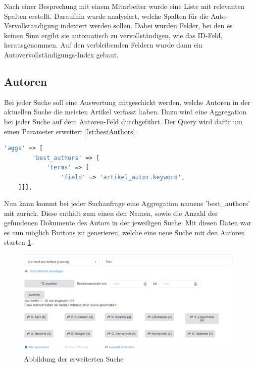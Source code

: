 Nach einer Besprechung mit einem Mitarbeiter wurde eine Liste mit relevanten Spalten erstellt. Daraufhin wurde analysiert, welche Spalten für die Auto-Vervollständigung indexiert werden sollen. Dabei wurden Felder, bei den es keinen Sinn ergibt sie automatisch zu vervollständigen, wie das ID-Feld, herausgenommen. Auf den verbleibenden Feldern wurde dann ein Autovervollständigungs-Index gebaut.

\subsection{Autoren}

Bei jeder Suche soll eine Auswertung mitgeschickt werden, welche Autoren in der aktuellen Suche die meisten Artikel verfasst haben. Dazu wird eine Aggregation bei jeder Suche auf dem Autoren-Feld durchgeführt. Der Query wird dafür um einen Parameter erweitert \ref{lst:bestAuthors}.

\begin{lstlisting}[language=PHP, frame=single, label={lst:bestAuthors}] 
    'aggs' => [
        'best_authors' => [
            'terms' => [
                'field' => 'artikel_autor.keyword',
    ]]],
\end{lstlisting}


Nun kann kommt bei jeder Suchanfrage eine Aggregation namens 'best\_authors' mit zurück. Diese enthält zum einen den Namen, sowie die Anzahl der gefundenen Dokumente des Autors in der jeweiligen Suche. 
Mit diesen Daten war es nun möglich Buttons zu generieren, welche eine neue Suche mit den Autoren starten \ref{img:erweiterteSuche}.


\begin{figure}
	\centering
	\includegraphics[width=1\linewidth]{images/best_authors.png}
	\caption{Abbildung der erweiterten Suche}
	\label{img:erweiterteSuche}
\end{figure}
